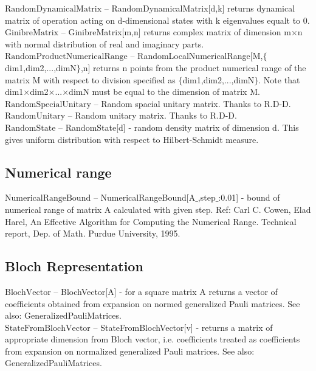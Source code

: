 \noindent\textbf{$ \text{RandomDynamicalMatrix} $ }-- RandomDynamicalMatrix[d,k] returns dynamical matrix of operation acting on d-dimensional states with k eigenvalues equalt to 0.$  $\\

\noindent\textbf{$ \text{GinibreMatrix} $ }-- GinibreMatrix[m,n] returns complex matrix of dimension m$\times $n with normal distribution of real and imaginary parts.$  $\\

\noindent\textbf{$ \text{RandomProductNumericalRange} $ }-- RandomLocalNumericalRange[M,$\{$dim1,dim2,...,dimN$\}$,n] returns n points from the product numerical range of the matrix M with respect to division specified as $\{$dim1,dim2,...,dimN$\}$. Note that dim1$\times $dim2$\times $...$\times $dimN must be equal to the dimension of matrix M.$  $\\

\noindent\textbf{$ \text{RandomSpecialUnitary} $ }-- Random spacial unitary matrix. Thanks to R.D-D.$  $\\

\noindent\textbf{$ \text{RandomUnitary} $ }-- Random unitary matrix. Thanks to R.D-D.$  $\\

\noindent\textbf{$ \text{RandomState} $ }-- RandomState[d] - random density matrix of dimension d. This gives uniform distribution with respect to Hilbert-Schmidt measure.$  $\\

\subsection{Numerical range}

\noindent\textbf{$ \text{NumericalRangeBound} $ }-- NumericalRangeBound[A$\_$,step$\_$:0.01] - bound of numerical range of matrix A calculated with given step. Ref: Carl C. Cowen, Elad Harel, An Effective Algorithm for Computing the Numerical Range. Technical report, Dep. of Math. Purdue University, 1995.$  $\\

\subsection{Bloch Representation}

\noindent\textbf{$ \text{BlochVector} $ }-- BlochVector[A] - for a square matrix A returns a vector of coefficients obtained from expansion on normed generalized Pauli matrices. See also: GeneralizedPauliMatrices.$  $\\

\noindent\textbf{$ \text{StateFromBlochVector} $ }-- StateFromBlochVector[v] - returns a matrix of appropriate dimension from Bloch vector, i.e. coefficients treated as coefficients from expansion on normalized generalized Pauli matrices. See also: GeneralizedPauliMatrices.$  $\\




